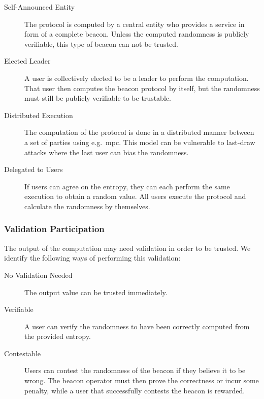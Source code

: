 \begin{description}
    \item[Self-Announced Entity] The protocol is computed by a central entity who provides a service in form of a complete beacon. Unless the computed randomness is publicly verifiable, this type of beacon can not be trusted.
    \item[Elected Leader] A user is collectively elected to be a leader to perform the computation. That user then computes the beacon protocol by itself, but the randomness must still be publicly verifiable to be trustable.
    \item[Distributed Execution]
        The computation of the protocol is done in a distributed manner between a set of parties using e.g.\ \gls{mpc}. This model can be vulnerable to last-draw attacks where the last user can bias the randomness.
    \item[Delegated to Users] If users can agree on the entropy, they can each perform the same execution to obtain a random value. All users execute the protocol and calculate the randomness by themselves.
\end{description}

\subsubsection{Validation Participation}
The output of the computation may need validation in order to be trusted. We identify the following ways of performing this validation:
\begin{description}
    \item[No Validation Needed] The output value can be trusted immediately. 
    \item [Verifiable] A user can verify the randomness to have been correctly computed from the provided entropy. 
    \item [Contestable] Users can contest the randomness of the beacon if they believe it to be wrong. The beacon operator must then prove the correctness or incur some penalty, while a user that successfully contests the beacon is rewarded.
\end{description}
